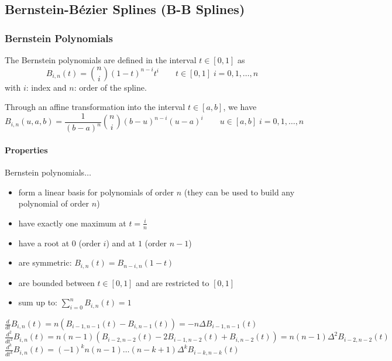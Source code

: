 \newpage
\subsection{Bernstein-Bézier Splines (B-B Splines)}

\begin{minipage}[c]{15.0cm}
	\subsubsection{Bernstein Polynomials}\label{sssec:spline_bernsteinpoly}
    	The Bernstein polynomials are defined in the interval $t\in[0,1]$ as
	    \[B_{i,n}(t) = \binom{n}{i}(1-t)^{n-i} t^i \qquad t \in [0,1]\; i=0,1,\ldots, n\]
	    with $i$: index and  $n$: order of the spline.

      Through an affine transformation into the interval $t \in [a,b]$, we have
	    \[B_{i,n}(u,a,b) =\frac{1}{(b-a)^n}\binom{n}{i}(b-u)^{n-i} (u-a)^i \qquad u \in [a,b]\; i=0,1,\ldots, n\]

      \paragraph{Properties}
      Bernstein polynomials$\ldots$
        \begin{itemize}
          \item form a linear basis for polynomials of order $n$ (they can be used to build any polynomial of order $n$)
          \item have exactly one maximum at $t=\frac in$
          \item have a root at $0$ (order $i$) and at $1$ (order $n-1$)
          \item are symmetric: $B_{i,n}(t) = B_{n-i,n}(1-t)$
          \item are bounded between $t \in [0,1]$ and are restricted to $[0,1]$
          \item sum up to: $\sum \limits_{i=0}^n B_{i,n}(t)=1$
        \end{itemize}

	    $\frac{d}{dt} B_{i,n}(t) = n(B_{i-1,n-1}(t) - B_{i,n-1}(t)) = -n \Delta B_{i-1,n-1}(t)$\\
	    $\frac{d^2}{dt^2} B_{i,n}(t) = n(n-1)(B_{i-2,n-2}(t) -2 B_{i-1,n-2}(t) + B_{i,n-2}(t)) = n(n-1) \Delta^2 B_{i-2,n-2}(t)$\\
	    $\frac{d^k}{dt^k} B_{i,n}(t) = (-1)^k n(n-1)\ldots(n-k+1) \Delta^k B_{i-k,n-k}(t)$
\end{minipage}
\hfill
